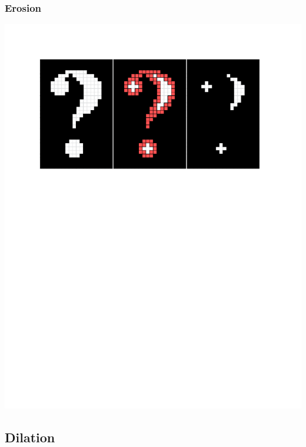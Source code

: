 \documentclass{beamer}
\begin{document}
\begin{frame}
\frametitle{Erosion}
\includegraphics[width=1\textwidth]{erosion}
\end{frame}

\subsection[Dilation]{Dilation}
\end{document}
